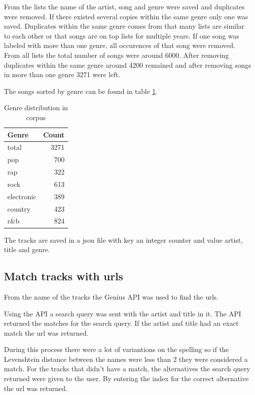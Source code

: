 \documentclass[a4paper, 12pt]{article}
\begin{document}
From the lists the name of the artist, song and genre were saved and duplicates were removed.
If there existed several copies within the same genre only one was saved.
Duplicates within the same genre comes from that many lists are similar to each other or that songs are on top lists for multiple years.
If one song was labeled with more than one genre, all occurences of that song were removed.
From all lists the total number of songs were around 6000.
After removing duplicates within the same genre around 4200 remained and after removing songs in more than one genre 3271 were left.

The songs sorted by genre can be found in table \ref{tab:distribution}.

\begin{center}
\begin{table}[h]
    \centering
    \begin{tabular}{| l | r |}
    \hline
    Genre & Count \\ \hline
    total & 3271 \\
    pop & 700 \\
    rap & 322 \\
    rock & 613 \\
    electronic & 389 \\
    country & 423 \\
    r\&b & 824 \\ \hline
  \end{tabular}
  \caption{Genre distribution in corpus}
  \label{tab:distribution}
\end{table}
\end{center}

The tracks are saved in a json file with key an integer counter and value artist, title and genre.

\subsection{Match tracks with urls}
From the name of the tracks the Genius API was used to find the urls. 

Using the API a search query was sent with the artist and title in it.
The API returned the matches for the search query.
If the artist and title had an exact match the url was returned.

During this process there were a lot of variantions on the spelling so if the Levenshtein distance between the names were less than 2 they were considered a match.
For the tracks that didn't have a match, the alternatives the search query returned were given to the user.
By entering the index for the correct alternative the url was returned.
\end{document}
